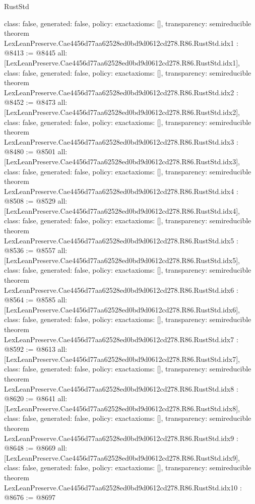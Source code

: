 \begin{lexlean}{RustStd}
\begin{coremodule}
{  class: false,
  generated: false,
  policy: exact{axioms: []},
  transparency: semireducible
}
theorem LexLeanPreserve.Cae4456d77aa62528ed0bd9d0612cd278.R86.RustStd.idx1 : @8413 := @8445 {
  all: [LexLeanPreserve.Cae4456d77aa62528ed0bd9d0612cd278.R86.RustStd.idx1],
  class: false,
  generated: false,
  policy: exact{axioms: []},
  transparency: semireducible
}
theorem LexLeanPreserve.Cae4456d77aa62528ed0bd9d0612cd278.R86.RustStd.idx2 : @8452 := @8473 {
  all: [LexLeanPreserve.Cae4456d77aa62528ed0bd9d0612cd278.R86.RustStd.idx2],
  class: false,
  generated: false,
  policy: exact{axioms: []},
  transparency: semireducible
}
theorem LexLeanPreserve.Cae4456d77aa62528ed0bd9d0612cd278.R86.RustStd.idx3 : @8480 := @8501 {
  all: [LexLeanPreserve.Cae4456d77aa62528ed0bd9d0612cd278.R86.RustStd.idx3],
  class: false,
  generated: false,
  policy: exact{axioms: []},
  transparency: semireducible
}
theorem LexLeanPreserve.Cae4456d77aa62528ed0bd9d0612cd278.R86.RustStd.idx4 : @8508 := @8529 {
  all: [LexLeanPreserve.Cae4456d77aa62528ed0bd9d0612cd278.R86.RustStd.idx4],
  class: false,
  generated: false,
  policy: exact{axioms: []},
  transparency: semireducible
}
theorem LexLeanPreserve.Cae4456d77aa62528ed0bd9d0612cd278.R86.RustStd.idx5 : @8536 := @8557 {
  all: [LexLeanPreserve.Cae4456d77aa62528ed0bd9d0612cd278.R86.RustStd.idx5],
  class: false,
  generated: false,
  policy: exact{axioms: []},
  transparency: semireducible
}
theorem LexLeanPreserve.Cae4456d77aa62528ed0bd9d0612cd278.R86.RustStd.idx6 : @8564 := @8585 {
  all: [LexLeanPreserve.Cae4456d77aa62528ed0bd9d0612cd278.R86.RustStd.idx6],
  class: false,
  generated: false,
  policy: exact{axioms: []},
  transparency: semireducible
}
theorem LexLeanPreserve.Cae4456d77aa62528ed0bd9d0612cd278.R86.RustStd.idx7 : @8592 := @8613 {
  all: [LexLeanPreserve.Cae4456d77aa62528ed0bd9d0612cd278.R86.RustStd.idx7],
  class: false,
  generated: false,
  policy: exact{axioms: []},
  transparency: semireducible
}
theorem LexLeanPreserve.Cae4456d77aa62528ed0bd9d0612cd278.R86.RustStd.idx8 : @8620 := @8641 {
  all: [LexLeanPreserve.Cae4456d77aa62528ed0bd9d0612cd278.R86.RustStd.idx8],
  class: false,
  generated: false,
  policy: exact{axioms: []},
  transparency: semireducible
}
theorem LexLeanPreserve.Cae4456d77aa62528ed0bd9d0612cd278.R86.RustStd.idx9 : @8648 := @8669 {
  all: [LexLeanPreserve.Cae4456d77aa62528ed0bd9d0612cd278.R86.RustStd.idx9],
  class: false,
  generated: false,
  policy: exact{axioms: []},
  transparency: semireducible
}
theorem LexLeanPreserve.Cae4456d77aa62528ed0bd9d0612cd278.R86.RustStd.idx10 : @8676 := @8697 {
}
\end{coremodule}
\end{lexlean}
